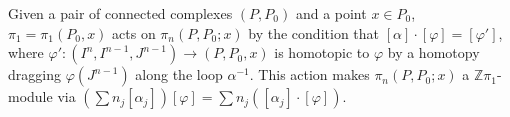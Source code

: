 Given a pair of connected complexes $(P, P_0)$ and a point $x \in P_0$, $\pi_1 = \pi_1(P_0, x)$ acts on $\pi_n(P, P_0; x)$ by the condition that $[\alpha] \cdot [\varphi] = [\varphi']$, where $\varphi' : (I^n, I^{n-1}, J^{n-1}) \rightarrow (P, P_0, x)$ is homotopic to $\varphi$ by a homotopy dragging $\varphi(J^{n-1})$ along the loop $\alpha^{-1}$. This action makes $\pi_n(P, P_0; x)$ a $\mathbb{Z}\pi_1$-module via $(\sum n_j [\alpha_j])[\varphi] = \sum n_j ([\alpha_j] \cdot [\varphi])$.
